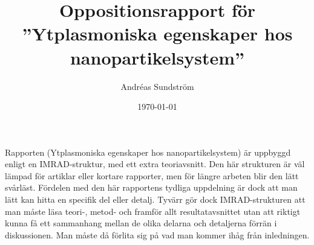 \documentclass[11pt,a4paper, english, swedish
]{article}
\begin{document}
\title{Oppositionsrapport för
\\\Large ''Ytplasmoniska egenskaper hos nanopartikelsystem'' }
\author{Andréas Sundström}
\date{\today}

\maketitle








\noindent
Rapporten (Ytplasmoniska egenskaper hos nanopartikelsystem) är uppbyggd enligt en IMRAD-struktur, med ett extra teoriavsnitt. Den här strukturen är väl lämpad för artiklar eller kortare rapporter, men för längre arbeten blir den lätt svårläst. Fördelen med den här rapportens tydliga uppdelning är dock att man lätt kan hitta en specifik del eller detalj. 
Tyvärr gör dock IMRAD-strukturen att man måste läsa teori-, metod- och framför allt resultatavsnittet utan att riktigt kunna få ett sammanhang mellan de olika delarna och detaljerna förrän i diskussionen. Man måste då förlita sig på vad man kommer ihåg från inledningen. 
\end{document}
